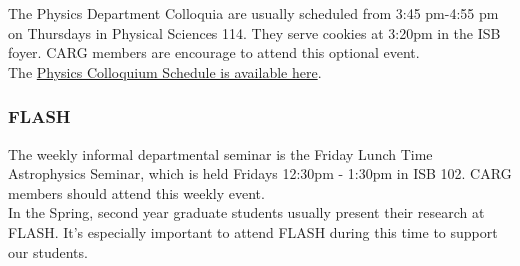 The Physics Department Colloquia are usually
scheduled from 3:45 pm-4:55 pm on Thursdays
in Physical Sciences 114. They serve
cookies at 3:20pm in the ISB foyer. 
CARG members are encourage to attend
this optional event.\\

\noindent
The
\href{https://www.physics.ucsc.edu/news-events/colloquia/index.html}{Physics Colloquium Schedule is available here}.

\subsubsection{FLASH}
\label{sec:flash}

The weekly informal departmental
seminar is the
Friday Lunch Time Astrophysics Seminar,
which is held
Fridays 12:30pm - 1:30pm in ISB 102.
CARG members should attend this
weekly event.\\

\noindent
In the Spring, second year 
graduate students
usually present their research at
FLASH. It's especially important
to attend FLASH during this
time to support our students.
